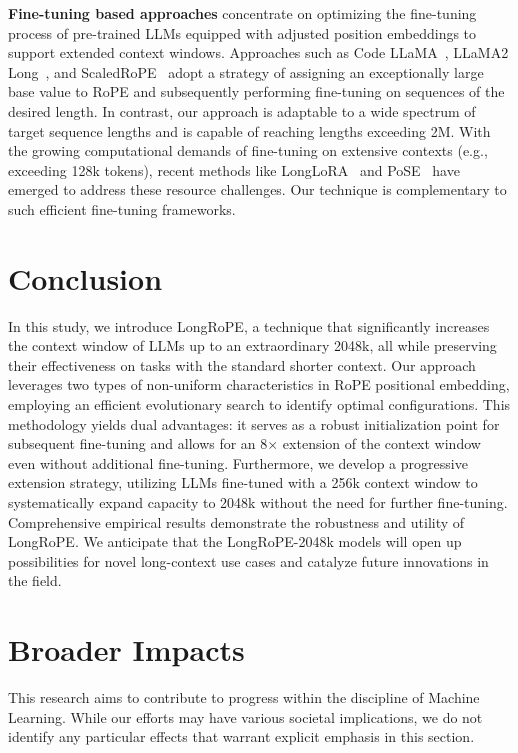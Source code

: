 \textbf{Fine-tuning based approaches} concentrate on optimizing the fine-tuning process of pre-trained LLMs equipped with adjusted position embeddings to support extended context windows. Approaches such as Code LLaMA~\cite{codellama}, LLaMA2 Long~\cite{xiong2023effective}, and ScaledRoPE~\cite{liu2023scaling} adopt a strategy of assigning an exceptionally large base value to RoPE and subsequently performing fine-tuning on sequences of the desired length. In contrast, our approach is adaptable to a wide spectrum of target sequence lengths and is capable of reaching lengths exceeding 2M. With the growing computational demands of fine-tuning on extensive contexts (e.g., exceeding 128k tokens), recent methods like LongLoRA~\cite{longlora} and PoSE~\cite{zhu2023pose} have emerged to address these resource challenges. Our technique is complementary to such efficient fine-tuning frameworks.

\section{Conclusion}

In this study, we introduce LongRoPE, a technique that significantly increases the context window of LLMs up to an extraordinary 2048k, all while preserving their effectiveness on tasks with the standard shorter context. Our approach leverages two types of non-uniform characteristics in RoPE positional embedding, employing an efficient evolutionary search to identify optimal configurations. This methodology yields dual advantages: it serves as a robust initialization point for subsequent fine-tuning and allows for an 8$\times$ extension of the context window even without additional fine-tuning. Furthermore, we develop a progressive extension strategy, utilizing LLMs fine-tuned with a 256k context window to systematically expand capacity to 2048k without the need for further fine-tuning. Comprehensive empirical results demonstrate the robustness and utility of LongRoPE. We anticipate that the LongRoPE-2048k models will open up possibilities for novel long-context use cases and catalyze future innovations in the field.

\section*{Broader Impacts} This research aims to contribute to progress within the discipline of Machine Learning. While our efforts may have various societal implications, we do not identify any particular effects that warrant explicit emphasis in this section.

	\balance

